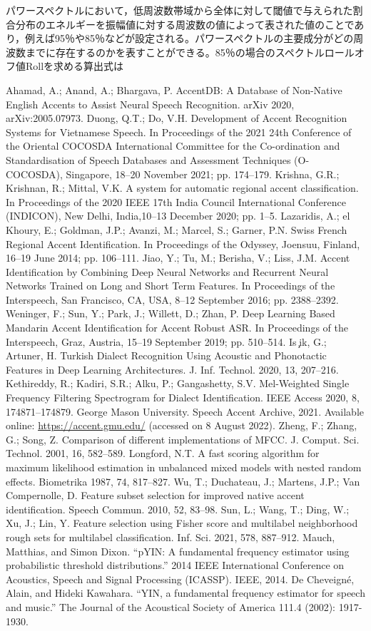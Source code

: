 パワースペクトルにおいて，低周波数帯域から全体に対して閾値で与えられた割合分布のエネルギーを振幅値に対する周波数の値によって表された値のことであり，例えば95％や85％などが設定される。パワースペクトルの主要成分がどの周波数までに存在するのかを表すことができる。85％の場合のスペクトルロールオフ値Rollを求める算出式は\documentclass[ams]{U-AizuGT}
\begin{document}
\begin{thebibliography}{}
\bibitem[11]{}Ahamad, A.; Anand, A.; Bhargava, P. AccentDB: A Database of Non-Native English Accents to Assist Neural Speech Recognition. arXiv 2020, arXiv:2005.07973.
\bibitem[12]{}Duong, Q.T.; Do, V.H. Development of Accent Recognition Systems for Vietnamese Speech. In Proceedings of the 2021 24th Conference of the Oriental COCOSDA International Committee for the Co-ordination and Standardisation of Speech Databases and Assessment Techniques (O-COCOSDA), Singapore, 18–20 November 2021; pp. 174–179.
\bibitem[13]{}Krishna, G.R.; Krishnan, R.; Mittal, V.K. A system for automatic regional accent classification. In Proceedings of the 2020 IEEE 17th India Council International Conference (INDICON), New Delhi, India,10–13 December 2020; pp. 1–5.
\bibitem[14]{}Lazaridis, A.; el Khoury, E.; Goldman, J.P.; Avanzi, M.; Marcel, S.; Garner, P.N. Swiss French Regional Accent Identification. In Proceedings of the Odyssey, Joensuu, Finland, 16–19 June 2014; pp. 106–111.
\bibitem[15]{}Jiao, Y.; Tu, M.; Berisha, V.; Liss, J.M. Accent Identification by Combining Deep Neural Networks and Recurrent Neural Networks Trained on Long and Short Term Features. In Proceedings of the Interspeech, San Francisco, CA, USA, 8–12 September 2016; pp. 2388–2392.
\bibitem[16]{}Weninger, F.; Sun, Y.; Park, J.; Willett, D.; Zhan, P. Deep Learning Based Mandarin Accent Identification for Accent Robust ASR. In Proceedings of the Interspeech, Graz, Austria, 15–19 September 2019; pp. 510–514.
\bibitem[17]{}Is ̧ik, G.; Artuner, H. Turkish Dialect Recognition Using Acoustic and Phonotactic Features in Deep Learning Architectures. J. Inf. Technol. 2020, 13, 207–216.
\bibitem[18]{}Kethireddy, R.; Kadiri, S.R.; Alku, P.; Gangashetty, S.V. Mel-Weighted Single Frequency Filtering Spectrogram for Dialect Identification. IEEE Access 2020, 8, 174871–174879. 
\bibitem[19]{}George Mason University. Speech Accent Archive, 2021. Available online: \url{https://accent.gmu.edu/} (accessed on 8 August 2022).
\bibitem[20]{}Zheng, F.; Zhang, G.; Song, Z. Comparison of different implementations of MFCC. J. Comput. Sci. Technol. 2001, 16, 582–589.
\bibitem[21]{}Longford, N.T. A fast scoring algorithm for maximum likelihood estimation in unbalanced mixed models with nested random effects. Biometrika 1987, 74, 817–827.
\bibitem[22]{}Wu, T.; Duchateau, J.; Martens, J.P.; Van Compernolle, D. Feature subset selection for improved native accent identification. Speech Commun. 2010, 52, 83–98.
\bibitem[23]{}Sun, L.; Wang, T.; Ding, W.; Xu, J.; Lin, Y. Feature selection using Fisher score and multilabel neighborhood rough sets for multilabel classification. Inf. Sci. 2021, 578, 887–912.
\bibitem[24]{}Mauch, Matthias, and Simon Dixon. “pYIN: A fundamental frequency estimator using probabilistic threshold distributions.” 2014 IEEE International Conference on Acoustics, Speech and Signal Processing (ICASSP). IEEE, 2014.
\bibitem[25]{}De Cheveigné, Alain, and Hideki Kawahara. “YIN, a fundamental frequency estimator for speech and music.” The Journal of the Acoustical Society of America 111.4 (2002): 1917-1930.
\end{thebibliography}
\end{document}

